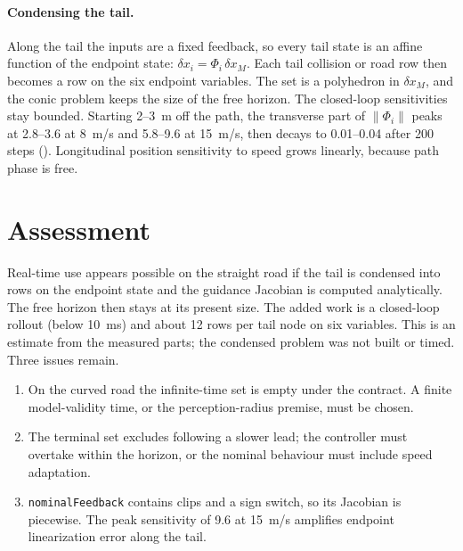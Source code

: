 \documentclass[11pt]{article}
\begin{document}
\paragraph{Condensing the tail.} Along the tail the inputs are a fixed
feedback, so every tail state is an affine function of the endpoint state:
$\delta x_i=\Phi_i\,\delta x_M$. Each tail collision or road row then becomes a
row on the six endpoint variables. The set is a polyhedron in $\delta x_M$, and
the conic problem keeps the size of the free horizon. The closed-loop
sensitivities stay bounded. Starting 2--3~m off the path, the transverse part
of $\|\Phi_i\|$ peaks at 2.8--3.6 at 8~m/s and 5.8--9.6 at 15~m/s, then decays
to 0.01--0.04 after 200 steps (). Longitudinal position
sensitivity to speed grows linearly, because path phase is free.

\section{Assessment}
Real-time use appears possible on the straight road if the tail is condensed
into rows on the endpoint state and the guidance Jacobian is computed
analytically. The free horizon then stays at its present size. The added work
is a closed-loop rollout (below 10~ms) and about 12 rows per tail node on six
variables. This is an estimate from the measured parts; the condensed problem
was not built or timed. Three issues remain.
\begin{enumerate}
\item On the curved road the infinite-time set is empty under the contract. A
  finite model-validity time, or the perception-radius premise, must be chosen.
\item The terminal set excludes following a slower lead; the controller must
  overtake within the horizon, or the nominal behaviour must include speed
  adaptation.
\item \texttt{nominalFeedback} contains clips and a sign switch, so its
  Jacobian is piecewise. The peak sensitivity of 9.6 at 15~m/s amplifies
  endpoint linearization error along the tail.
\end{enumerate}
\end{document}

